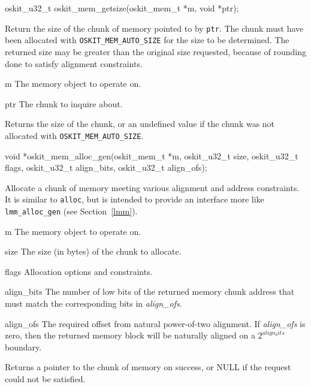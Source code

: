 \begin{apisyn}

	\funcproto oskit_u32_t
		oskit_mem_getsize(oskit_mem_t *m, void *ptr);
\end{apisyn}
\begin{apidesc}
	Return the size of the chunk of memory pointed to by \texttt{ptr}.
	The chunk must have been allocated with	\texttt{OSKIT_MEM_AUTO_SIZE}
	for the size to be determined. The returned size may be greater
	than the original size requested, because of rounding done to
	satisfy alignment constraints. 
\end{apidesc}
\begin{apiparm}
	\item[m]
		The memory object to operate on.
	\item[ptr]
		The chunk to inquire about.
\end{apiparm}
\begin{apiret}
	Returns the size of the chunk, or an undefined value if the chunk
	was not allocated with \texttt{OSKIT_MEM_AUTO_SIZE}.
\end{apiret}


\begin{apisyn}

	\funcproto void *oskit_mem_alloc_gen(oskit_mem_t *m,
				oskit_u32_t size,
				oskit_u32_t flags, oskit_u32_t align_bits,
				oskit_u32_t align_ofs);
\end{apisyn}
\begin{apidesc}
	Allocate a chunk of memory meeting various alignment and address
	constraints. It is similar to \texttt{alloc}, but is intended to
	provide an interface more like \texttt{lmm_alloc_gen} (see
	Section~\ref{lmm}).
\end{apidesc}
\begin{apiparm}
	\item[m]
		The memory object to operate on.
	\item[size]
		The size (in bytes) of the chunk to allocate.
	\item[flags]
		Allocation options and constraints.
	\item[align_bits]
		The number of low bits of the returned memory chunk address
		that must match the corresponding bits in \emph{align_ofs}.
	\item[align_ofs]
		The required offset from natural power-of-two alignment.
		If \emph{align_ofs} is zero,
		then the returned memory block will be naturally aligned
		on a $2^{align_bits}$ boundary.
\end{apiparm}
\begin{apiret}
	Returns a pointer to the chunk of memory on success, or NULL if
	the request could not be satisfied.
\end{apiret}


